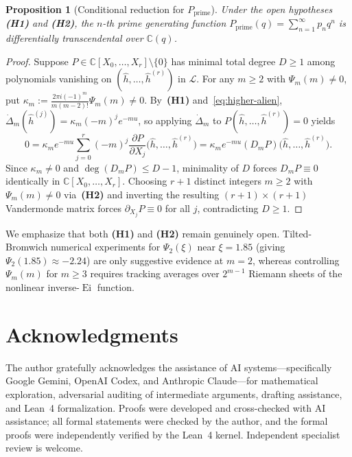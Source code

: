 \documentclass[10pt,reqno]{amsart}
\numberwithin{equation}{section}
\newtheorem{proposition}{Proposition}[section]
\theoremstyle{definition}
\newcommand{\C}{\mathbb{C}}
\newcommand{\cL}{\mathcal{L}}
\DeclareMathOperator{\Ei}{Ei}
\begin{document}
\begin{proposition}[Conditional reduction for $P_{\mathrm{prime}}$]\label{prop:pprime-cond}
Under the open hypotheses \textbf{(H1)} and \textbf{(H2)}, the $n$-th prime generating function $P_{\mathrm{prime}}(q) = \sum_{n=1}^\infty p_n q^n$ is differentially transcendental over $\C(q)$.
\end{proposition}

\begin{proof}
Suppose $P \in \C[X_0, \dots, X_r] \setminus \{0\}$ has minimal total degree $D \ge 1$ among polynomials vanishing on $(\widehat{h}, \dots, \widehat{h}^{(r)})$ in $\cL$. For any $m \ge 2$ with $\Psi_m(m) \neq 0$, put $\kappa_m := \frac{2\pi i(-1)^m}{m(m-2)!}\Psi_m(m) \neq 0$. By~\textbf{(H1)} and~\eqref{eq:higher-alien}, $\dot{\Delta}_m(\widehat{h}^{(j)}) = \kappa_m (-m)^j e^{-mu}$, so applying $\dot{\Delta}_m$ to $P(\widehat{h}, \dots, \widehat{h}^{(r)}) = 0$ yields
\[
  0 = \kappa_m e^{-mu} \sum_{j=0}^r (-m)^j \frac{\partial P}{\partial X_j}\bigl(\widehat{h}, \dots, \widehat{h}^{(r)}\bigr)
  = \kappa_m e^{-mu} (D_m P)\bigl(\widehat{h}, \dots, \widehat{h}^{(r)}\bigr).
\]
Since $\kappa_m \neq 0$ and $\deg(D_m P) \le D - 1$, minimality of $D$ forces $D_m P \equiv 0$ identically in $\C[X_0, \dots, X_r]$. Choosing $r + 1$ distinct integers $m \ge 2$ with $\Psi_m(m) \neq 0$ via~\textbf{(H2)} and inverting the resulting $(r+1)\times(r+1)$ Vandermonde matrix forces $\partial_{X_j} P \equiv 0$ for all $j$, contradicting $D \ge 1$.
\end{proof}

We emphasize that both \textbf{(H1)} and \textbf{(H2)} remain genuinely open. Tilted-Bromwich numerical experiments for $\Psi_2(\xi)$ near $\xi = 1.85$ (giving $\Psi_2(1.85) \approx -2.24$) are only suggestive evidence at $m = 2$, whereas controlling $\Psi_m(m)$ for $m \ge 3$ requires tracking averages over $2^{m-1}$ Riemann sheets of the nonlinear inverse-$\Ei$ function.

\section*{Acknowledgments}

The author gratefully acknowledges the assistance of AI systems---specifically Google Gemini, OpenAI Codex, and Anthropic Claude---for mathematical exploration, adversarial auditing of intermediate arguments, drafting assistance, and Lean~4 formalization. Proofs were developed and cross-checked with AI assistance; all formal statements were checked by the author, and the formal proofs were independently verified by the Lean~4 kernel. Independent specialist review is welcome.



\end{document}
